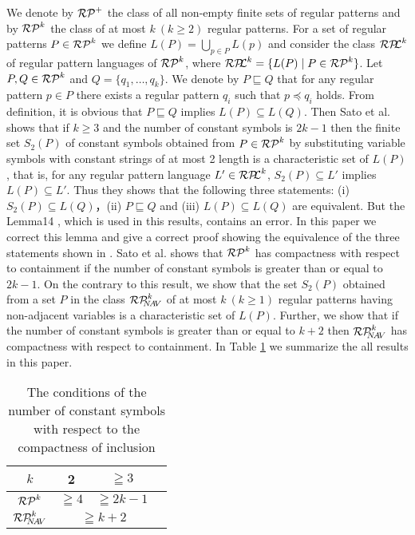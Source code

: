 We denote by $\mathcal{RP}^{+}$ the class of all non-empty finite sets of regular patterns and
by $\mathcal{RP}^{k}$ the class of at most $k~(k\geq 2)$ regular patterns.
For a set of regular patterns $P\in\mathcal{RP}^{k}$ we define $L(P)=\bigcup_{p\in P}L(p)$ and consider the class $\mathcal{RP\!\!L}^{k}$ of regular pattern languages of $\mathcal{RP}^{k}$, where $\mathcal{RP\!\!L}^{k} = \{L(P) \mid P\in \mathcal{RP}^{k}\}$.
Let $P,Q\in \mathcal{RP}^{k}$ and $Q= \{ q_{1}, \ldots, q_{k} \}$.
We denote by $P\sqsubseteq Q$ that for any regular pattern $p\in P$ there exists a regular pattern $q_{i}$ such that $p\preceq q_{i}$ holds.
From definition, it is obvious that $P \sqsubseteq Q$ implies $L(P)\subseteq L(Q)$.
%
Then Sato et al.\cite{Sato1} shows that 
if $k \ge 3$ and the number of constant symbols is $2k-1$ then 
the finite set $S_2(P)$ of constant symbols obtained from $P\in \mathcal{RP}^{k}$ by substituting variable symbols with constant strings of at most 2 length is a characteristic set of $L(P)$, 
that is, for any regular pattern language $L'\in \mathcal{RP\!\!L}^{k}$, $S_2(P) \subseteq L'$ implies $L(P)\subseteq L'$.
Thus they shows that the following three statements: (i) $S_2(P) \subseteq L(Q)$，(ii) $P\sqsubseteq Q$ and (iii) $L(P)\subseteq L(Q)$ are equivalent. 
%
But the Lemma14 \cite{Sato1}, which is used in this results, contains an error.
In this paper we correct this lemma and give a correct proof showing the equivalence of the three statements shown in \cite{Sato1}.
Sato et al.\cite{Sato1} shows that $\mathcal{RP}^{k}$ has compactness with respect to containment if the number of constant symbols is greater than or equal to $2k-1$.
On the contrary to this result, we show that the set $S_2(P)$ obtained from a set $P$ in the class $\mathcal{RP}^{k}_{\!\!\!N\!A\!V}$ of at most $k~(k\ge 1)$ regular patterns having non-adjacent variables is a characteristic set of $L(P)$.
Further, we show that if the number of constant symbols is greater than or equal to $k+2$ then $\mathcal{RP}^{k}_{\!\!\!N\!A\!V}$ has compactness with respect to containment.
In Table \ref{table1} we summarize the all results in this paper.

\begin{table}[hbt]
\begin{center}
\vspace{-0.4cm}
\caption{The conditions of the number of constant symbols with respect to the compactness of inclusion}
\label{table1}
\begin{tabular}{llll}
\hline
\multicolumn{1}{|c|}{$k$}   & \multicolumn{1}{c|}{2}                            & \multicolumn{1}{c|}{$ \geqq 3$} \\ 
\hline
\hline
\multicolumn{1}{|c|}{$\mathcal{RP}^{k}$} & \multicolumn{1}{c|}{$ \geqq 4$}                          & \multicolumn{1}{c|}{$ \geqq 2k-1$} \\ \hline
\multicolumn{1}{|c|}{$\mathcal{RP}^{k}_{\!\!\!N\!A\!V}$} & \multicolumn{2}{c|}{$ \geqq k+2$} \\ \hline
\end{tabular}
\end{center}
\end{table}

